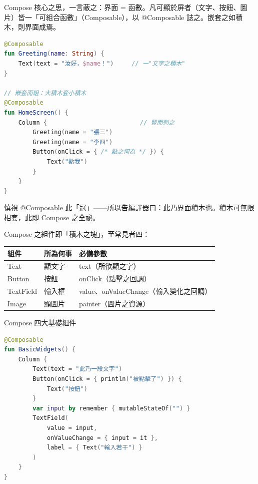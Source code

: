 


Compose 核心之思，一言蔽之：界面 = 函數。凡可顯於屏者（文字、按鈕、圖片）皆一「可組合函數」（Composable），以 @Composable 誌之。嵌套之如積木，則界面成焉。

\begin{lstlisting}[language=Kotlin]
@Composable
fun Greeting(name: String) {
    Text(text = "汝好，$name！")     // 一"文字之積木"
}

// 嵌套而組：大積木套小積木
@Composable
fun HomeScreen() {
    Column {                          // 豎而列之
        Greeting(name = "張三")
        Greeting(name = "李四")
        Button(onClick = { /* 點之何為 */ }) {
            Text("點我")
        }
    }
}
\end{lstlisting}

慎視 @Composable 此「冠」——所以告編譯器曰：此乃界面積木也。積木可無限相套，此即 Compose 之全祕。


Compose 之組件即「積木之塊」，至常見者四：

\begin{center}
\begin{tabularx}{\linewidth}{|X|X|X|}
\hline
\textbf{組件} & \textbf{所為何事} & \textbf{必備參數} \tabularnewline
\hline
Text & 顯文字 & text（所欲顯之字） \tabularnewline
Button & 按鈕 & onClick（點擊之回調） \tabularnewline
TextField & 輸入框 & value、onValueChange（輸入變化之回調） \tabularnewline
Image & 顯圖片 & painter（圖片之資源） \tabularnewline
\hline
\end{tabularx}
\end{center}

\begin{center}\small\color{gray}Compose 四大基礎組件\end{center}

\begin{lstlisting}[language=Kotlin]
@Composable
fun BasicWidgets() {
    Column {
        Text(text = "此乃一段文字")
        Button(onClick = { println("被點擊了") }) {
            Text("按鈕")
        }
        var input by remember { mutableStateOf("") }
        TextField(
            value = input,
            onValueChange = { input = it },
            label = { Text("輸入若干") }
        )
    }
}
\end{lstlisting}

